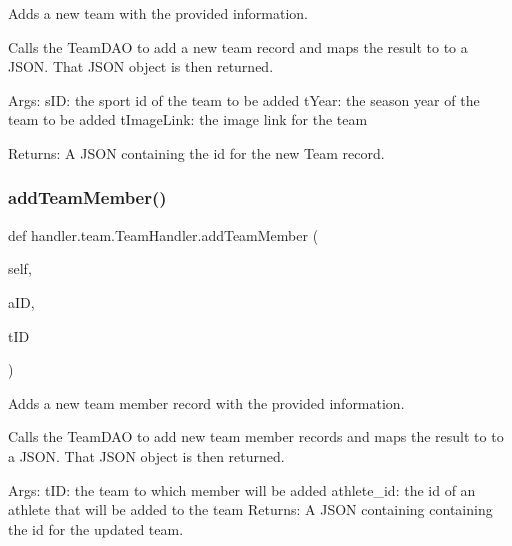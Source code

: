 \begin{DoxyVerb}Adds a new team with the provided information.

Calls the TeamDAO to add a new team record and maps the result to
to a JSON. That JSON object is then returned.

Args:
    sID: the sport id of the team to be added
    tYear: the season year of the team to be added
    tImageLink: the image link for the team
    
Returns:
    A JSON containing the id for the new Team record.
\end{DoxyVerb}
 \mbox{\label{classhandler_1_1team_1_1_team_handler_a1f3809c59410d793a9b5db0de1a3b6b8}} 
\subsubsection{\texorpdfstring{add\+Team\+Member()}{addTeamMember()}}
{\footnotesize\ttfamily def handler.\+team.\+Team\+Handler.\+add\+Team\+Member (\begin{DoxyParamCaption}\item[{}]{self,  }\item[{}]{a\+ID,  }\item[{}]{t\+ID }\end{DoxyParamCaption})}

\begin{DoxyVerb}Adds a new team member record with the provided information.

Calls the TeamDAO to add new team member records and maps the result to
to a JSON. That JSON object 
is then returned.

Args:
    tID: the team to which member will be added
    athlete_id: the id of an athlete that will be added to the team
Returns:
    A JSON containing containing the id for the updated team.
\end{DoxyVerb}
 \mbox{\label{classhandler_1_1team_1_1_team_handler_ae689082bd35b83e30cac03ad19d79ba5}} 
